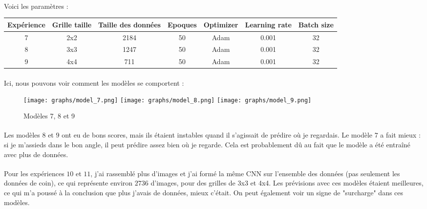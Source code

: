 \paragraph{}
Voici les paramètres :

\begin{center}
    \begin{tabular}{ c | c | c | c | c | c | c }
        \hline
        Expérience & Grille taille & Taille des données & Epoques & Optimizer & Learning rate & Batch size \\ 
        \hline
        7 & 2x2 & 2184 & 50 & Adam & 0.001 & 32 \\
        \hline
        8 & 3x3 & 1247 & 50 & Adam & 0.001 & 32 \\
        \hline
        9 & 4x4 & 711 & 50 & Adam & 0.001 & 32 \\
        \hline
    \end{tabular}
\end{center}

\paragraph{}
Ici, nous pouvons voir comment les modèles se comportent :

\begin{figure}[H]
    \centering
    \texttt{[image: graphs/model\_7.png]}
    \texttt{[image: graphs/model\_8.png]}
    \texttt{[image: graphs/model\_9.png]}
    \caption{Modèles 7, 8 et 9}
\end{figure}

\paragraph{}
Les modèles $8$ et $9$ ont eu de bons scores, mais ils étaient instables quand il s'agissait de prédire où je regardais.
Le modèle $7$ a fait mieux : si je m'assieds dans le bon angle, il peut prédire assez bien où je regarde.
Cela est probablement dû au fait que le modèle a été entraîné avec plus de données.


\paragraph{}
Pour les expériences $10$ et $11$, j'ai rassemblé plus d'images et j'ai formé la même CNN sur l'ensemble des données (pas seulement les données de coin), ce qui représente environ $2736$ d'images, pour des grilles de 3x3 et 4x4.
Les prévisions avec ces modèles étaient meilleures, ce qui m'a poussé à la conclusion que plus j'avais de données, mieux c'était.
On peut également voir un signe de "surcharge" dans ces modèles.

